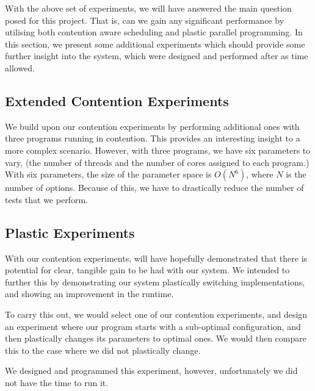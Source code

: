 With the above set of experiments, we will have answered the main question posed for this project. That is, can we gain any significant performance by utilising both contention aware scheduling and plastic parallel programming. In this section, we present some additional experiments which should provide some further insight into the system, which were designed and performed after as time allowed.



\subsection{Extended Contention Experiments}
\label{section:design:extended_contention_experiments}

We build upon our contention experiments by performing additional ones with three programs running in contention. This provides an interesting insight to a more complex scenario. However, with three programs, we have six parameters to vary, (the number of threads and the number of cores assigned to each program.) With six parameters, the size of the parameter space is $O(N^6)$, where $N$ is the number of options. Because of this, we have to drastically reduce the number of tests that we perform.



\subsection{Plastic Experiments}
\label{section:design:plastic_experiment}

With our contention experiments, will have hopefully demonstrated that there is potential for clear, tangible gain to be had with our system. We intended to further this by demonstrating our system plastically switching implementations, and showing an improvement in the runtime. 

To carry this out, we would select one of our contention experiments, and design an experiment where our program starts with a sub-optimal configuration, and then plastically changes its parameters to optimal ones. We would then compare this to the case where we did not plastically change.

We designed and programmed this experiment, however, unfortunately we did not have the time to run it.